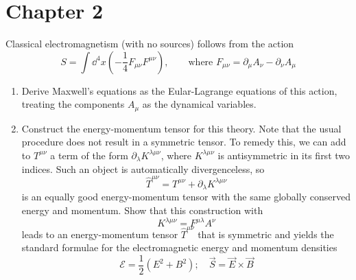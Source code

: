 \section{Chapter 2}

\setcounter{equation}{66}
\problem Classical electromagnetism (with no sources) follows from the action
\begin{equation}
    S = \int \dd^4 x \left(-\frac{1}{4} F_{\mu\nu} F^{\mu\nu} \right), 
    \qquad \text{where } F_{\mu\nu} = \partial_\mu A_\nu - \partial_\nu A_\mu
\end{equation}
\begin{enumerate}[label = {(\alph*)}]
    \item Derive Maxwell's equations as the Eular-Lagrange equations of this action, treating the 
    components $A_\mu$ as the dynamical variables.
    \item Construct the energy-momentum tensor for this theory. Note that the usual procedure does
    not result in a symmetric tensor. To remedy this, we can add to $T^{\mu\nu}$ a term of the form 
    $\partial_\lambda K^{\lambda\mu\nu}$, where $K^{\lambda\mu\nu}$ is antisymmetric in its first two
    indices. Such an object is automatically divergenceless, so
    \begin{equation*}
        \widehat{T}^{\mu\nu} = T^{\mu\nu} + \partial_\lambda K^{\lambda\mu\nu}
    \end{equation*}
    is an equally good energy-momentum tensor with the same globally conserved energy and momentum. Show 
    that this construction with
    \begin{equation*}
        K^{\lambda\mu\nu} = F^{\mu\lambda} A^\nu
    \end{equation*}
    leads to an energy-momentum tensor $\widehat{T}^{\mu\nu}$ that is symmetric and yields the standard
    formulae for the electromagnetic energy and momentum densities
    \begin{equation*}
        \mathcal{E} = \frac{1}{2}(E^2 + B^2); \quad \vec{S} = \vec{E} \times \vec{B}
    \end{equation*}
\end{enumerate}

